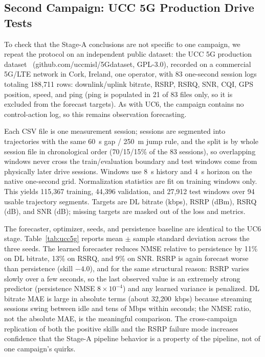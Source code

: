 \documentclass[10pt,twocolumn]{article}
\begin{document}
\begin{table}[t]
\centering
\caption{UC6 real-measurement Stage-A forecast quality over a 4-second horizon
on chronologically later, segment-isolated test sessions. Skill is
$1-\mathrm{NMSE}_{\text{model}}/\mathrm{NMSE}_{\text{persistence}}$; positive
is better. Values are mean $\pm$ sample standard deviation over three
initialization seeds; persistence has zero variance by construction. MAE is in
physical units.}
\label{tab:uc6}

\end{table}

\subsection{Second Campaign: UCC 5G Production Drive Tests}
\label{sec:ucc5g}
To check that the Stage-A conclusions are not specific to one campaign, we
repeat the protocol on an independent public dataset: the UCC 5G production
dataset~\cite{ucc5gdataset} (github.com/uccmisl/5Gdataset, GPL-3.0), recorded
on a commercial 5G/LTE network in Cork, Ireland, one operator, with 83
one-second session logs totaling 188{,}711 rows: downlink/uplink bitrate,
RSRP, RSRQ, SNR, CQI, GPS position, speed, and ping (ping is populated in
21 of 83 files only, so it is excluded from the forecast targets). As with
UC6, the campaign contains no control-action log, so this remains
observation forecasting.

Each CSV file is one measurement session; sessions are segmented into
trajectories with the same 60~s gap / 250~m jump rule, and the split is by
whole session file in chronological order (70/15/15\% of the 83 sessions),
so overlapping windows never cross the train/evaluation boundary and test
windows come from physically later drive sessions. Windows use 8~s history
and 4~s horizon on the native one-second grid. Normalization statistics are
fit on training windows only. This yields 115{,}367 training, 44{,}396
validation, and 27{,}912 test windows over 94 usable trajectory segments.
Targets are DL bitrate (kbps), RSRP (dBm), RSRQ (dB), and SNR (dB); missing
targets are masked out of the loss and metrics.

The forecaster, optimizer, seeds, and persistence baseline are identical to
the UC6 stage. Table~\ref{tab:ucc5g} reports mean $\pm$ sample standard
deviation across the three seeds. The learned forecaster reduces NMSE
relative to persistence by 11\% on DL bitrate, 13\% on RSRQ, and 9\% on SNR.
RSRP is again forecast worse than persistence (skill $-4.0$), and for the
same structural reason: RSRP varies slowly over a few seconds, so the last
observed value is an extremely strong predictor (persistence NMSE
$8\times10^{-4}$) and any learned variance is penalized. DL bitrate MAE is
large in absolute terms (about 32{,}200~kbps) because streaming sessions
swing between idle and tens of Mbps within seconds; the NMSE ratio, not the
absolute MAE, is the meaningful comparison. The cross-campaign replication
of both the positive skills and the RSRP failure mode increases confidence
that the Stage-A pipeline behavior is a property of the pipeline, not of one
campaign's quirks.
\end{document}
